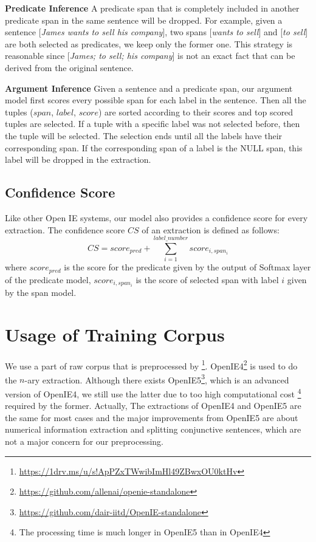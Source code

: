 \documentclass[letterpaper]{article} \usepackage{aaai20}  \usepackage{times}  \usepackage{helvet} \usepackage{courier}  \usepackage[hyphens]{url}  \urlstyle{rm} \def\UrlFont{\rm}  \usepackage{graphicx}  \frenchspacing  \setlength{\pdfpagewidth}{8.5in}  \setlength{\pdfpageheight}{11in}
\begin{document}
\textbf{Predicate Inference} A predicate span that is completely included in another predicate span in the same sentence will be dropped. For example, given a sentence [\emph{James wants to sell his company}], two spans [\emph{wants to sell}] and [\emph{to sell}] are both selected as predicates, we keep only the former one. This strategy is reasonable since [\emph{James; to sell; his company}] is not an exact fact that can be derived from the original sentence.

\textbf{Argument Inference} Given a sentence and a predicate span, our argument model first scores every possible span for each label in the sentence. Then all the tuples ($span$, $label$, $score$) are sorted according to their scores and top scored tuples are selected. If a tuple with a specific label was not selected before, then the tuple will be selected. The selection ends until all the labels have their corresponding span. If the corresponding span of a label is the NULL span, this label will be dropped in the extraction.

 

\subsection{Confidence Score}
Like other Open IE systems, our model also provides a confidence score for every extraction. The confidence score $CS$ of an extraction is defined as follows:
\begin{equation}
        CS = score_{pred} + \sum_{i=1}^{label\_number}score_{i,span_i}
\end{equation}
where $score_{pred}$ is the score for the predicate given by the output of Softmax layer of the predicate model, $score_{i,span_i}$ is the score of selected span with label $i$ given by the span model.

\section{Usage of Training Corpus}
We use a part of raw corpus that is preprocessed by \cite{Cui2018NeuralOI}\footnote{\url{https://1drv.ms/u/s!ApPZxTWwibImHl49ZBwxOU0ktHv}}. OpenIE4\footnote{\url{https://github.com/allenai/openie-standalone}} is used to do the $n$-ary extraction. Although there exists OpenIE5\footnote{\url{https://github.com/dair-iitd/OpenIE-standalone}}, which is an advanced version of OpenIE4, we still use the latter due to too high computational cost \footnote{The processing time is much longer in OpenIE5 than in OpenIE4} required by the former. Actually, The extractions of OpenIE4 and OpenIE5 are the same for most cases and the major improvements from OpenIE5 are about numerical information extraction and splitting conjunctive sentences, which are not a major concern for our preprocessing. 
\end{document}
